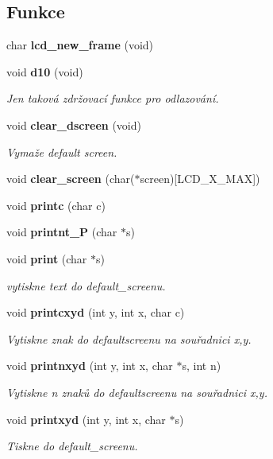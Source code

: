 \subsection*{Funkce}
\begin{DoxyCompactItemize}
\item 
char {\bf lcd\_\-new\_\-frame} (void)
\item 
void {\bf d10} (void)
\begin{DoxyCompactList}\small\item\em Jen taková zdržovací funkce pro odlazování. \item\end{DoxyCompactList}\item 
void {\bf clear\_\-dscreen} (void)
\begin{DoxyCompactList}\small\item\em Vymaže default screen. \item\end{DoxyCompactList}\item 
void {\bf clear\_\-screen} (char($\ast$screen)[LCD\_\-X\_\-MAX])
\item 
void {\bf printc} (char c)
\item 
void {\bf printnt\_\-P} (char $\ast$s)
\item 
void {\bf print} (char $\ast$s)
\begin{DoxyCompactList}\small\item\em vytiskne text do default\_\-screenu. \item\end{DoxyCompactList}\item 
void {\bf printcxyd} (int y, int x, char c)
\begin{DoxyCompactList}\small\item\em Vytiskne znak do defaultscreenu na souřadnici x,y. \item\end{DoxyCompactList}\item 
void {\bf printnxyd} (int y, int x, char $\ast$s, int n)
\begin{DoxyCompactList}\small\item\em Vytiskne n znaků do defaultscreenu na souřadnici x,y. \item\end{DoxyCompactList}\item 
void {\bf printxyd} (int y, int x, char $\ast$s)
\begin{DoxyCompactList}\small\item\em Tiskne do default\_\-screenu. \item\end{DoxyCompactList}\item 

\end{DoxyCompactItemize}
